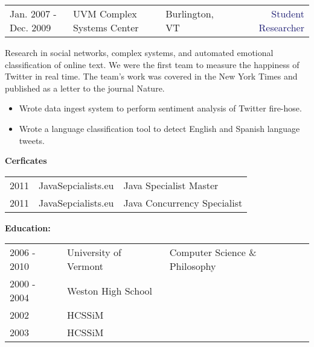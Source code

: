 \documentclass{article}
\begin{document}
\pagebreak
\vspace{15pt}\begin{tabularx}{\textwidth}{@{}lllXr}
  Jan. 2007 - Dec. 2009&\textcolor{Mahogany}{UVM Complex Systems Center}&\textcolor{Black!80}{Burlington, VT}&&\textcolor{MidnightBlue}{Student Researcher}
\end{tabularx}

\vspace{3pt} Research in social networks, complex systems, and automated  emotional classification of online text.
We were the first team to measure the happiness of Twitter in real time. The team's work was covered in the New York Times and published as a letter to the journal Nature.
\begin{multicols}{2}
  \begin{small}
    \begin{itemize}[leftmargin=*,label=\tiny{$\bullet$}]
    \item\begin{minipage}[t]{\linewidth}{Wrote data ingest system to perform sentiment analysis of Twitter fire-hose.}\end{minipage}
    \item\begin{minipage}[t]{\linewidth}{Wrote a language classification tool to detect English and Spanish language tweets.}\end{minipage}
    \end{itemize}
  \end{small} 
\end{multicols}

\vspace{10pt}\textbf{Cerficates}

\vspace{3pt}\begin{tabular}{lll}
  2011 & JavaSepcialists.eu & Java Specialist Master\\
  2011 & JavaSepcialists.eu & Java Concurrency Specialist
\end{tabular}

\vspace{10pt}\textbf{Education:}

\vspace{3pt}\begin{tabular}{lll}
  2006 - 2010 & University of Vermont & Computer Science \& Philosophy\\
  2000 - 2004 & Weston High School &  \\
  2002 &  HCSSiM & \\
  2003 &  HCSSiM & \\ 
\end{tabular}
\end{document}
